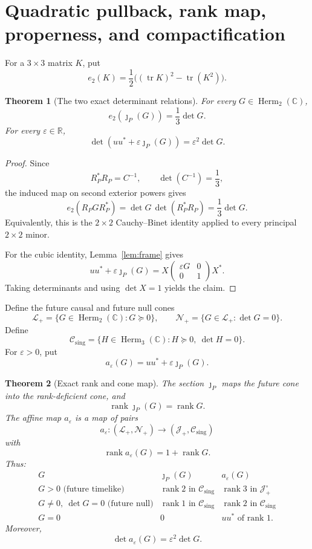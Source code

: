 \documentclass[11pt]{article}
\newtheorem{theorem}{Theorem}[section]
\theoremstyle{definition}
\newcommand{\C}{\mathbb C}
\newcommand{\R}{\mathbb R}
\newcommand{\Herm}{\operatorname{Herm}}
\newcommand{\tr}{\operatorname{tr}}
\newcommand{\rank}{\operatorname{rank}}
\newcommand{\Jp}{\mathcal J_+}
\newcommand{\Lp}{\mathcal L_+}
\newcommand{\Np}{\mathcal N_+}
\newcommand{\Cs}{\mathcal C_{\mathrm{sing}}}
\begin{document}
\section{Quadratic pullback, rank map, properness, and compactification}

For a $3\times3$ matrix $K$, put
\[
 e_2(K)=\frac12\bigl((\tr K)^2-\tr(K^2)\bigr).
\]

\begin{theorem}[The two exact determinant relations]\label{thm:det-relations}
For every $G\in\Herm_2(\C)$,
\[
 \boxed{
 e_2(\jmath_P(G))=\frac13\det G.}
\]
For every $\varepsilon\in\R$,
\[
 \boxed{
 \det(uu^*+\varepsilon\jmath_P(G))
 =\varepsilon^2\det G.}
\]
\end{theorem}

\begin{proof}
Since
\[
 R_P^*R_P=C^{-1},\qquad \det(C^{-1})=\frac13,
\]
the induced map on second exterior powers gives
\[
 e_2(R_PGR_P^*)
 =\det G\,\det(R_P^*R_P)
 =\frac13\det G.
\]
Equivalently, this is the $2\times2$ Cauchy--Binet identity applied to every principal $2\times2$ minor.

For the cubic identity, Lemma~\ref{lem:frame} gives
\[
 uu^*+\varepsilon\jmath_P(G)
 =X\begin{pmatrix}\varepsilon G&0\\0&1\end{pmatrix}X^*.
\]
Taking determinants and using $\det X=1$ yields the claim.
\end{proof}

Define the future causal and future null cones
\[
 \Lp=\{G\in\Herm_2(\C):G\succeq0\},
 \qquad
 \Np=\{G\in\Lp:\det G=0\}.
\]
Define
\[
 \Cs=\{H\in\Herm_3(\C):H\succeq0,\ \det H=0\}.
\]
For $\varepsilon>0$, put
\[
 a_\varepsilon(G)=uu^*+\varepsilon\jmath_P(G).
\]

\begin{theorem}[Exact rank and cone map]\label{thm:rank-map}
The section $\jmath_P$ maps the future cone into the rank-deficient cone, and
\[
 \rank\jmath_P(G)=\rank G.
\]
The affine map $a_\varepsilon$ is a map of pairs
\[
 a_\varepsilon:(\Lp,\Np)\longrightarrow(\Jp,\Cs)
\]
with
\[
 \rank a_\varepsilon(G)=1+\rank G.
\]
Thus:
\[
\begin{array}{c|c|c}
G&\jmath_P(G)&a_\varepsilon(G)\\ \hline
G>0\text{ (future timelike)}&\rank2\text{ in }\Cs&\rank3\text{ in }\Jp^\circ\\
G\neq0,\ \det G=0\text{ (future null)}&\rank1\text{ in }\Cs&\rank2\text{ in }\Cs\\
G=0&0&uu^*\text{ of rank }1.
\end{array}
\]
Moreover,
\[
 \det a_\varepsilon(G)=\varepsilon^2\det G.
\]
\end{theorem}
\end{document}
